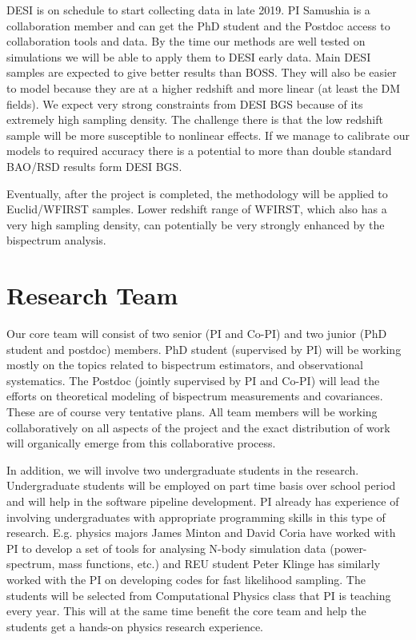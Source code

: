 DESI is on schedule to start collecting data in late 2019. PI Samushia is a
collaboration member and can get the PhD student and the Postdoc access to
collaboration tools and data. By the time our methods are well tested on
simulations we will be able to apply them to DESI early data. Main DESI samples
are expected to give better results than BOSS. They will also be easier to
model because they are at a higher redshift and more linear (at least the DM
fields). We expect very strong constraints from DESI BGS because of its
extremely high sampling density. The challenge there is that the low redshift
sample will be more susceptible to nonlinear effects. If we manage to calibrate
our models to required accuracy there is a potential to more than double
standard BAO/RSD results form DESI BGS.

Eventually, after the project is completed, the methodology will be applied to
Euclid/WFIRST samples. Lower redshift range of WFIRST, which also has a very
high sampling density, can potentially be very strongly enhanced by the
bispectrum analysis.

\section{Research Team}

Our core team will consist of two senior (PI and Co-PI) and two junior (PhD
student and postdoc) members. PhD student (supervised by PI) will be working
mostly on the topics related to bispectrum estimators, and observational
systematics. The Postdoc (jointly supervised by PI and Co-PI) will lead the
efforts on theoretical modeling of bispectrum measurements and covariances.
These are of course very tentative plans. All team members will be working
collaboratively on all aspects of the project and the exact distribution of
work will organically emerge from this collaborative process. 

In addition, we will involve two undergraduate students in the research.
Undergraduate students will be employed on part time basis over school period
and will help in the software pipeline development. PI already has experience
of involving undergraduates with appropriate programming skills in this type of
research. E.g. physics majors James Minton and David Coria have worked with PI
to develop a set of tools for analysing N-body simulation data (power-spectrum,
mass functions, etc.) and REU student Peter Klinge has similarly worked with
the PI on developing codes for fast likelihood sampling. The students will be
selected from Computational Physics class that PI is teaching every year. This
will at the same time benefit the core team and help the students get a
hands-on physics research experience.

